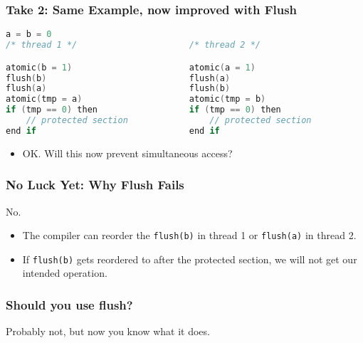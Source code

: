 \begin{frame}[fragile]
  \frametitle{Take 2: Same Example, now improved with Flush}

  \begin{lstlisting}[language=C,morekeywords={foreach,pragma,omp,parallel,single,nowait,task,untied,barrier,taskyield,mergeable,final,taskwait,critical}]
                    a = b = 0
/* thread 1 */                      /* thread 2 */

atomic(b = 1)                       atomic(a = 1)
flush(b)                            flush(a)
flush(a)                            flush(b)
atomic(tmp = a)                     atomic(tmp = b)
if (tmp == 0) then                  if (tmp == 0) then
    // protected section                // protected section
end if                              end if
  \end{lstlisting}

  \begin{itemize}
    \item OK. Will this now prevent simultaneous access?
  \end{itemize}
\end{frame}

\begin{frame}[fragile]
  \frametitle{No Luck Yet: Why Flush Fails}

  

  \begin{center}
    \alert{\LARGE No.}
  \end{center}

  \begin{itemize}
    \item The compiler can reorder the {\tt flush(b)} in thread 1 or
      {\tt flush(a)} in thread 2.

    \item If {\tt flush(b)} gets reordered to after the protected
      section, we will not get our intended operation.
  \end{itemize}
  
\end{frame}

\begin{frame}[fragile]
  \frametitle{Should you use flush?}

  
  \Large
  Probably not, but now you know what it does.
  

\end{frame}



